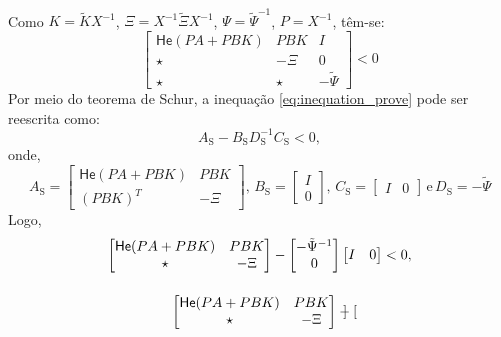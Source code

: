 \begin{gather}
\end{gather} Como $K = \tilde{K}X^{-1}$, $\Xi= X^{-1}\tilde{\Xi}X^{-1}$, $\Psi = \tilde{\Psi}^{-1}$, $P = X^{-1}$, têm-se: \begin{equation}
  \begin{bmatrix}
    \mathsf{He}(PA +PBK) & PBK   & I             \\
    \star                & -\Xi  & 0             \\
    \star                & \star & -\tilde{\Psi}
  \end{bmatrix} < 0
  \label{eq:inequation_prove}
\end{equation} Por meio do teorema de Schur, a inequação \eqref{eq:inequation_prove} pode ser reescrita como: \begin{equation}
  A_{\mathrm{S}} - B_{\mathrm{S}}D_{\mathrm{S}}^{-1}C_{\mathrm{S}} < 0,
\end{equation} onde, \begin{equation}
  A_{\mathrm{S}} = \begin{bmatrix}
    \mathsf{He}(PA +PBK) & PBK  \\
    (PBK)^T              & -\Xi
  \end{bmatrix}, \,
  B_{\mathrm{S}} = \begin{bmatrix}
    I \\ 0
  \end{bmatrix}, \,
  C_{\mathrm{S}} = \begin{bmatrix}
    I & 0
  \end{bmatrix} \, \mathrm{e} \,
  D_{\mathrm{S}} = -\tilde{\Psi}
\end{equation} Logo, \begin{gather}
  \begin{bmatrix}
    \mathsf{He}(PA +PBK) & PBK  \\
    \star                & -\Xi
  \end{bmatrix} -
  \begin{bmatrix}
    -\tilde{\Psi}^{-1} \\ 0
  \end{bmatrix}
  \begin{bmatrix}
    I & 0
  \end{bmatrix} < 0, \notag \notag \\[12pt]
  \begin{bmatrix}
    \mathsf{He}(PA +PBK) & PBK  \\
    \star                & -\Xi
  \end{bmatrix} -
  \begin{bmatrix}

\end{bmatrix}
\end{gather}
